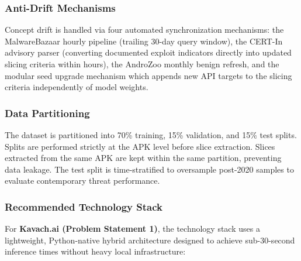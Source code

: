 \documentclass[10pt,a4paper]{article}
\begin{document}
\subsubsection*{Anti-Drift Mechanisms}

Concept drift is handled via four automated synchronization mechanisms: the MalwareBazaar hourly pipeline (trailing 30-day query window), the CERT-In advisory parser (converting documented exploit indicators directly into updated slicing criteria within hours), the AndroZoo monthly benign refresh, and the modular seed upgrade mechanism which appends new API targets to the slicing criteria independently of model weights.

\subsubsection*{Data Partitioning}

The dataset is partitioned into 70\% training, 15\% validation, and 15\% test splits. Splits are performed strictly at the APK level before slice extraction. Slices extracted from the same APK are kept within the same partition, preventing data leakage. The test split is time-stratified to oversample post-2020 samples to evaluate contemporary threat performance.

\subsubsection*{Recommended Technology Stack}

For \textbf{Kavach.ai (Problem Statement 1)}, the technology stack uses a lightweight, Python-native hybrid architecture designed to achieve sub-30-second inference times without heavy local infrastructure:
\end{document}

